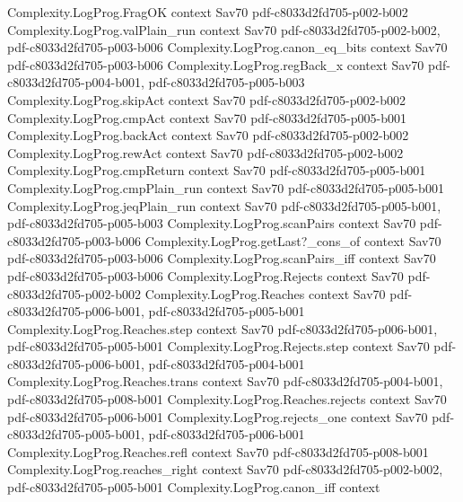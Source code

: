 \begin{theorem}
\proofstep
  {Complexity.LogProg.FragOK}
  {context}
  {Sav70}
  {pdf-c8033d2fd705-p002-b002}
\proofstep
  {Complexity.LogProg.valPlain_run}
  {context}
  {Sav70}
  {pdf-c8033d2fd705-p002-b002,
    pdf-c8033d2fd705-p003-b006}
\proofstep
  {Complexity.LogProg.canon_eq_bits}
  {context}
  {Sav70}
  {pdf-c8033d2fd705-p003-b006}
\proofstep
  {Complexity.LogProg.regBack_x}
  {context}
  {Sav70}
  {pdf-c8033d2fd705-p004-b001,
    pdf-c8033d2fd705-p005-b003}
\proofstep
  {Complexity.LogProg.skipAct}
  {context}
  {Sav70}
  {pdf-c8033d2fd705-p002-b002}
\proofstep
  {Complexity.LogProg.cmpAct}
  {context}
  {Sav70}
  {pdf-c8033d2fd705-p005-b001}
\proofstep
  {Complexity.LogProg.backAct}
  {context}
  {Sav70}
  {pdf-c8033d2fd705-p002-b002}
\proofstep
  {Complexity.LogProg.rewAct}
  {context}
  {Sav70}
  {pdf-c8033d2fd705-p002-b002}
\proofstep
  {Complexity.LogProg.cmpReturn}
  {context}
  {Sav70}
  {pdf-c8033d2fd705-p005-b001}
\proofstep
  {Complexity.LogProg.cmpPlain_run}
  {context}
  {Sav70}
  {pdf-c8033d2fd705-p005-b001}
\proofstep
  {Complexity.LogProg.jeqPlain_run}
  {context}
  {Sav70}
  {pdf-c8033d2fd705-p005-b001,
    pdf-c8033d2fd705-p005-b003}
\proofstep
  {Complexity.LogProg.scanPairs}
  {context}
  {Sav70}
  {pdf-c8033d2fd705-p003-b006}
\proofstep
  {Complexity.LogProg.getLast?_cons_of}
  {context}
  {Sav70}
  {pdf-c8033d2fd705-p003-b006}
\proofstep
  {Complexity.LogProg.scanPairs_iff}
  {context}
  {Sav70}
  {pdf-c8033d2fd705-p003-b006}
\proofstep
  {Complexity.LogProg.Rejects}
  {context}
  {Sav70}
  {pdf-c8033d2fd705-p002-b002}
\proofstep
  {Complexity.LogProg.Reaches}
  {context}
  {Sav70}
  {pdf-c8033d2fd705-p006-b001,
    pdf-c8033d2fd705-p005-b001}
\proofstep
  {Complexity.LogProg.Reaches.step}
  {context}
  {Sav70}
  {pdf-c8033d2fd705-p006-b001,
    pdf-c8033d2fd705-p005-b001}
\proofstep
  {Complexity.LogProg.Rejects.step}
  {context}
  {Sav70}
  {pdf-c8033d2fd705-p006-b001,
    pdf-c8033d2fd705-p004-b001}
\proofstep
  {Complexity.LogProg.Reaches.trans}
  {context}
  {Sav70}
  {pdf-c8033d2fd705-p004-b001,
    pdf-c8033d2fd705-p008-b001}
\proofstep
  {Complexity.LogProg.Reaches.rejects}
  {context}
  {Sav70}
  {pdf-c8033d2fd705-p006-b001}
\proofstep
  {Complexity.LogProg.rejects_one}
  {context}
  {Sav70}
  {pdf-c8033d2fd705-p005-b001,
    pdf-c8033d2fd705-p006-b001}
\proofstep
  {Complexity.LogProg.Reaches.refl}
  {context}
  {Sav70}
  {pdf-c8033d2fd705-p008-b001}
\proofstep
  {Complexity.LogProg.reaches_right}
  {context}
  {Sav70}
  {pdf-c8033d2fd705-p002-b002,
    pdf-c8033d2fd705-p005-b001}
\proofstep
  {Complexity.LogProg.canon_iff}
  {context}

\end{theorem}

